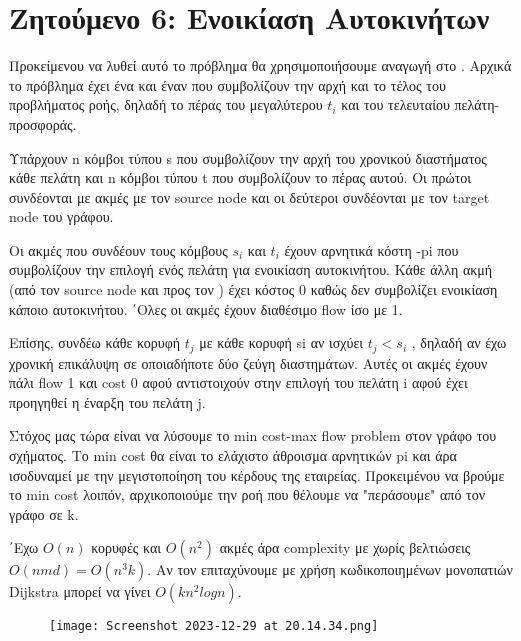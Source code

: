 \documentclass[11pt]{article}
\begin{document}
\section*{Ζητούμενο 6: Ενοικίαση Αυτοκινήτων}

\par Προκείμενου να λυθεί αυτό το πρόβλημα θα χρησιμοποιήσουμε αναγωγή στο . Αρχικά το πρόβλημα έχει ένα  και έναν  που
συμβολίζουν την αρχή και το τέλος του προβλήματος ροής, δηλαδή το πέρας του μεγαλύτερου $t_i$ και του τελευταίου πελάτη- προσφοράς.
\par Υπάρχουν n κόμβοι τύπου s που συμβολίζουν την αρχή του χρονικού διαστήματος κάθε
πελάτη και n κόμβοι τύπου t που συμβολίζουν το πέρας αυτού. Οι πρώτοι συνδέονται με
ακμές με τον source node και οι δεύτεροι συνδέονται με τον target node του γράφου.
\par Οι ακμές που συνδέουν τους κόμβους $s_i$ και $t_i$ έχουν αρνητικά κόστη -pi που συμβολίζουν την επιλογή ενός πελάτη για ενοικίαση αυτοκινήτου. Κάθε άλλη ακμή (από τον source node και προς τον ) έχει κόστος 0 καθώς δεν συμβολίζει ενοικίαση κάποιο αυτοκινήτου. ΄Ολες οι ακμές έχουν διαθέσιμο flow ίσο με 1.
\par Επίσης, συνδέω κάθε κορυφή $t_j$ με κάθε κορυφή si αν ισχύει $t_j < s_i$ , δηλαδή αν έχω
χρονική επικάλυψη σε οποιαδήποτε δύο ζεύγη διαστημάτων. Αυτές οι ακμές έχουν
πάλι flow 1 και cost 0 αφού αντιστοιχούν στην επιλογή του πελάτη i αφού έχει προηγηθεί η
έναρξη του πελάτη j.
\par Στόχος μας τώρα είναι να λύσουμε το min cost-max flow problem στον γράφο του
σχήματος. Το min cost θα είναι το ελάχιστο άθροισμα αρνητικών pi και άρα ισοδυναμεί με
την μεγιστοποίηση του κέρδους της εταιρείας. Προκειμένου να βρούμε το min
cost λοιπόν, αρχικοποιούμε την ροή που θέλουμε να "περάσουμε" από τον γράφο σε k.
\par ΄Εχω $O(n)$ κορυφές και $O(n^2)$ ακμές άρα complexity με  χωρίς βελτιώσεις $O(nmd) = O(n^3k)$. Αν τον επιταχύνουμε με χρήση κωδικοποιημένων μονοπατιών Dijkstra
μπορεί να γίνει $O(kn^2logn)$.
\begin{figure}[h]
  \texttt{[image: Screenshot 2023-12-29 at 20.14.34.png]}
  \centering
\end{figure}
\end{document}
